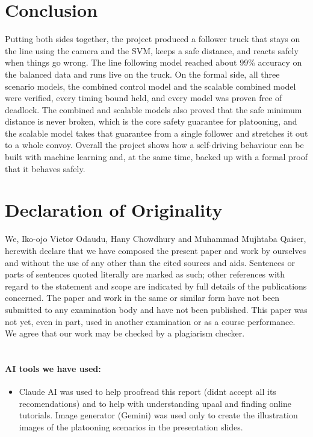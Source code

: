 \documentclass[english]{lni}
\begin{document}
\section{Conclusion}
Putting both sides together, the project produced a follower truck that stays on the line using the camera and the SVM, keeps a safe distance, and reacts safely when things go wrong. The line following model reached about 99\% accuracy on the balanced data and runs live on the truck. On the formal side, all three scenario models, the combined control model and the scalable combined model were verified, every timing bound held, and every model was proven free of deadlock. The combined and scalable models also proved that the safe minimum distance is never broken, which is the core safety guarantee for platooning, and the scalable model takes that guarantee from a single follower and stretches it out to a whole convoy. Overall the project shows how a self-driving behaviour can be built with machine learning and, at the same time, backed up with a formal proof that it behaves safely.

\section{Declaration of Originality}

We, Iko-ojo Victor Odaudu, Hany Chowdhury and Muhammad Mujhtaba Qaiser, herewith declare that we have composed the present paper and work by ourselves and without the use of any other than the cited sources and aids. Sentences or parts of sentences quoted literally are marked as such; other references with regard to the statement and scope are indicated by full details of the publications concerned. The paper and work in the same or similar form have not been submitted to any examination body and have not been published. This paper was not yet, even in part, used in another examination or as a course performance. We agree that our work may be checked by a plagiarism checker. \\~\\

\paragraph{AI tools we have used:}

\begin{itemize}
	\item Claude AI was used to help  proofread this report (didnt accept all its recomendations) and to help with understanding upaal and finding online tutorials.
	Image generator (Gemini) was used only to create the illustration images of the platooning scenarios in the presentation slides.
\end{itemize}
\end{document}
